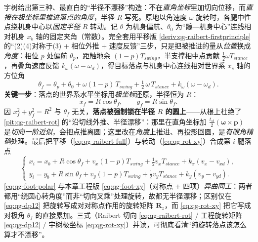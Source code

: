 \begin{derivation}\label{deriv:qg-rot-polar}
宇树给出第三种、最直白的“半径不漂移”构造\cite{unitree2023quadruped}：不在\emph{直角坐标}里加切向位移，而\emph{直接在极坐标里推进落点的角度}，半径 $R$ 写死。原地以角速度 $\omega$ 旋转时，各腿中性点绕机身中心以\emph{固定半径} $R$ 转动。记 $\theta$ 为机身偏航、$\theta_0$ 为“髋—机身中心”连线相对机身 $x_b$ 轴的固定夹角（常数）。完全套用平移版 \cref{deriv:qg-raibert-firstprinciple} 的“(2)(4)对称于(3) $+$ 相位外推 $+$ 速度反馈”三步，只是把被推进的量从\emph{位置}换成\emph{角度}：相位 $p$ 处偏航 $\theta_p$，距触地余 $(1-p)T_{swing}$，半支撑相中点贡献 $\tfrac12\omega T_{stance}$，再叠角速度反馈 $k_\omega(\omega-\omega_d)$，得目标落点与机身中心连线相对世界系 $x_s$ 轴的方位角
\begin{equation}
  \theta_f=\theta_p+\theta_0+\omega(1-p)\,T_{swing}+\tfrac12\,\omega\,T_{stance}+k_\omega(\omega-\omega_d).
  \label{eq:qg-rot-thetaf}
\end{equation}
\textbf{关键一步}：落点的世界系水平坐标用\emph{极坐标}还原，半径恒为 $R$：
\begin{equation}
  x_f=R\cos\theta_f,\qquad y_f=R\sin\theta_f.
  \label{eq:qg-rot-xy}
\end{equation}
因 $x_f^2+y_f^2=R^2$ 与 $\theta_f$ 无关，\textbf{落点被强制锁在半径 $R$ 的圆上}——从根上杜绝了 \cref{pit:qg-raibert-rot} 的“沿切线外推、半径漂移”：那里在直角坐标加 $\tfrac{t_{st}}{2}(\boldsymbol{\omega}\times\mathbf{p})$ 是\emph{切向一阶近似}，会把点推离圆；这里改在\emph{角度}上推进、再投影回圆，是\emph{有限角精确}处理。最后把平移（\cref{eq:qg-raibert-full}）与转动（\cref{eq:qg-rot-xy}）合成第 $i$ 腿落点
\begin{equation}
  \begin{cases}
  x_i=x_b+R\cos\theta_f+v_x(1-p)T_{swing}+\tfrac12 v_x T_{stance}+k_x(v_x-v_{xd}),\\
  y_i=y_b+R\sin\theta_f+v_y(1-p)T_{swing}+\tfrac12 v_y T_{stance}+k_y(v_y-v_{yd}).
  \end{cases}
  \label{eq:qg-foot-polar}
\end{equation}
\cref{eq:qg-foot-polar} 与本章工程版 \cref{eq:qg-foot-xy}（对称点 $+$ 四项）\emph{异曲同工}：两者都用“绕圆心转角度”而非“切向叉乘”处理旋转，故都无半径漂移；区别仅在 \cref{eq:qg-dp12} 把旋转写成对对称点作用的旋转矩阵 $\mathbf{R}_z$，而 \cref{eq:qg-rot-xy} 把它写成对极角 $\theta_f$ 的直接累加。三式（Raibert 切向 \cref{eq:qg-raibert-rot} / 工程旋转矩阵 \cref{eq:qg-dp12} / 宇树极坐标 \cref{eq:qg-rot-xy}）并读，可彻底看清“纯旋转落点该怎么算才不漂移”。
\end{derivation}

